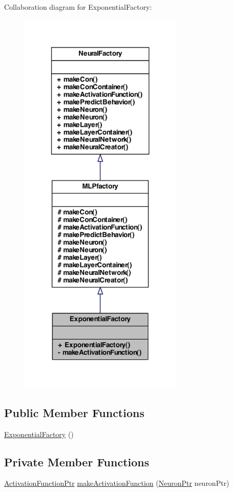 Collaboration diagram for ExponentialFactory:\nopagebreak
\begin{figure}[H]
\begin{center}
\leavevmode
\includegraphics[width=222pt]{class_exponential_factory__coll__graph}
\end{center}
\end{figure}
\subsection*{Public Member Functions}
\begin{DoxyCompactItemize}
\item 
\hyperlink{class_exponential_factory_afc852bdfae4ce077bcbfb2cb78e9c199}{ExponentialFactory} ()
\end{DoxyCompactItemize}
\subsection*{Private Member Functions}
\begin{DoxyCompactItemize}
\item 
\hyperlink{_a_m_o_r_e_8h_a77602a0277a02e5769c3df0adc669b17}{ActivationFunctionPtr} \hyperlink{class_exponential_factory_a68819f57ee476e87a2aa23827fc52578}{makeActivationFunction} (\hyperlink{_a_m_o_r_e_8h_ac1ea936c2c7728eb382278131652fef4}{NeuronPtr} neuronPtr)
\end{DoxyCompactItemize}


